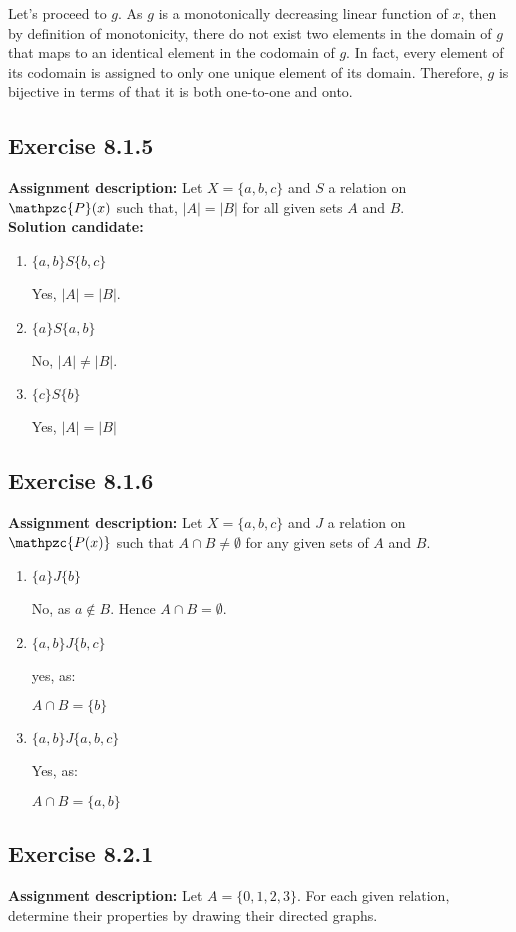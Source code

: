 \documentclass{report}
\newcommand{\cent}[1]{\begin{center}#1\end{center}}
\newcommand{\script}[1]{\mathpzc{#1}}
\newcommand{\AssignmentDescription}{\textbf{Assignment description: }}
\newcommand{\Solution}{\textbf{Solution candidate: }}
\newcommand{\Exercise}[1]{\subsection{Exercise #1}}
\newcommand{\defaultEnumerateLabel}{\textbf{\alph*.}}
\begin{document}
 	Let's proceed to $g$. As $g$ is a monotonically  decreasing linear function of $x$, then by definition of monotonicity, there do not exist two elements in the domain of $g$ that maps to an identical element in the codomain of $g$. In fact, every element of its codomain is assigned to only one unique element of its domain. Therefore, $g$ is bijective in terms of that it is both one-to-one and onto.
 	
 	\Exercise{8.1.5}
 	
 	\AssignmentDescription
 	Let $X=\{a,b,c\}$ and $S$ a relation on $\script{P}(x)$ such that,  $|A|=|B|$ for all given sets $A$ and $B$.\\
 	
 	\Solution
 	\begin{enumerate}[label=\defaultEnumerateLabel]
 		\item $\{a,b\} S \{b,c\}$
 		
 		Yes, $|A| = |B|$.
 		
 		\item $\{a\} S \{a,b\}$
 		
 		No, $|A| \neq |B| $.
 		
 		\item $\{c\} S \{b\}$
 		
 		Yes, $|A| = |B|$
 	\end{enumerate}
 	
 	\Exercise{8.1.6}
 	
 	\AssignmentDescription
 	Let $X=\{a,b,c\}$ and $J$ a relation on $\script{P(x)}$ such that $A\cap B \neq \emptyset$ for any given sets of $A$ and $B$.
 	
 	\begin{enumerate}[label = \defaultEnumerateLabel]
 		\item $\{a\} J \{b\}$
 		
 		No, as $a \notin B$. Hence $A \cap B = \emptyset$. 
 		
 		\item $\{a,b\} J \{b,c\}$
 		
 		yes, as:
 		
 		\cent{$A \cap B = \{b\}$}
 		
 		\item $\{a,b\} J \{a,b,c\}$
 		
 		Yes, as:
 		
 		\cent{$A \cap B = \{a,b\}$}
 	\end{enumerate}
 	
 	\Exercise{8.2.1}
 	
 	\AssignmentDescription
 	Let $A=\{0,1,2,3\}$. For each given relation, determine their properties by drawing their directed graphs.\\
 	
\end{document}

